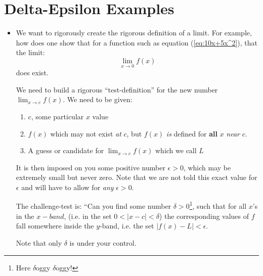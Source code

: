 \section{Delta-Epsilon Examples}
\begin{itemize}
    \item We want to rigorously create the rigorous definition of a limit. For example, how does one show that for a function such as equation (\ref{eq:10x+5x^2}), that the limit:
    \begin{equation}
        \lim_{x\to 0} f(x)
        \label{eq:}
    \end{equation}
    does exist.
    \begin{idea}
        We need to build a rigorous ``test-definition'' for the new number $\displaystyle \lim_{x\to c} f(x)$. We need to be given:
        \begin{enumerate}
            \item $c$, some particular $x$ value
            \item $f(x)$ which may not exist \textit{at} $c$, but $f(x)$ \emph{is} defined for \textbf{all} $x$ \textit{near} $c$.
            \item A guess or candidate for $\displaystyle \lim_{x\to c}f(x)$ which we call $L$
        \end{enumerate}
        It is then imposed on you some positive number $\epsilon>0$, which may be extremely small but never zero. Note that we are not told this exact value for $\epsilon$ and will have to allow for \textit{any} $\epsilon>0$.
        \vspace{2mm}

        The challenge-test is: ``Can you find some number $\delta>0$\footnote{Here $\delta$oggy $\delta$oggy!}, such that for all $x$'s in the $x-band$, (i.e. in the set $0<|x-c|<\delta$) the corresponding values of $f$ fall somewhere inside the $y$-band, i.e. the set $|f(x)-L|<\epsilon$.
        \vspace{2mm}

        Note that only $\delta$ is under your control.
    \end{idea}
\end{itemize}